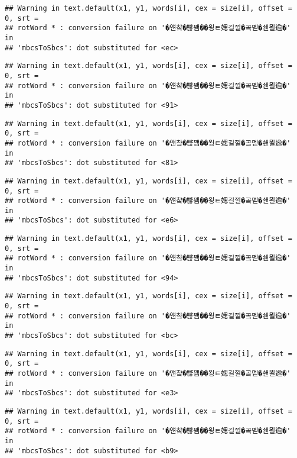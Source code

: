 \documentclass[]{article}
\begin{document}
\begin{verbatim}
## Warning in text.default(x1, y1, words[i], cex = size[i], offset = 0, srt =
## rotWord * : conversion failure on '�얜챸�뺞꽴��욍ㅌ媤길낄�곸몓�쇈묄逾�' in
## 'mbcsToSbcs': dot substituted for <ec>
\end{verbatim}

\begin{verbatim}
## Warning in text.default(x1, y1, words[i], cex = size[i], offset = 0, srt =
## rotWord * : conversion failure on '�얜챸�뺞꽴��욍ㅌ媤길낄�곸몓�쇈묄逾�' in
## 'mbcsToSbcs': dot substituted for <91>
\end{verbatim}

\begin{verbatim}
## Warning in text.default(x1, y1, words[i], cex = size[i], offset = 0, srt =
## rotWord * : conversion failure on '�얜챸�뺞꽴��욍ㅌ媤길낄�곸몓�쇈묄逾�' in
## 'mbcsToSbcs': dot substituted for <81>
\end{verbatim}

\begin{verbatim}
## Warning in text.default(x1, y1, words[i], cex = size[i], offset = 0, srt =
## rotWord * : conversion failure on '�얜챸�뺞꽴��욍ㅌ媤길낄�곸몓�쇈묄逾�' in
## 'mbcsToSbcs': dot substituted for <e6>
\end{verbatim}

\begin{verbatim}
## Warning in text.default(x1, y1, words[i], cex = size[i], offset = 0, srt =
## rotWord * : conversion failure on '�얜챸�뺞꽴��욍ㅌ媤길낄�곸몓�쇈묄逾�' in
## 'mbcsToSbcs': dot substituted for <94>
\end{verbatim}

\begin{verbatim}
## Warning in text.default(x1, y1, words[i], cex = size[i], offset = 0, srt =
## rotWord * : conversion failure on '�얜챸�뺞꽴��욍ㅌ媤길낄�곸몓�쇈묄逾�' in
## 'mbcsToSbcs': dot substituted for <bc>
\end{verbatim}

\begin{verbatim}
## Warning in text.default(x1, y1, words[i], cex = size[i], offset = 0, srt =
## rotWord * : conversion failure on '�얜챸�뺞꽴��욍ㅌ媤길낄�곸몓�쇈묄逾�' in
## 'mbcsToSbcs': dot substituted for <e3>
\end{verbatim}

\begin{verbatim}
## Warning in text.default(x1, y1, words[i], cex = size[i], offset = 0, srt =
## rotWord * : conversion failure on '�얜챸�뺞꽴��욍ㅌ媤길낄�곸몓�쇈묄逾�' in
## 'mbcsToSbcs': dot substituted for <b9>
\end{verbatim}
\end{document}
